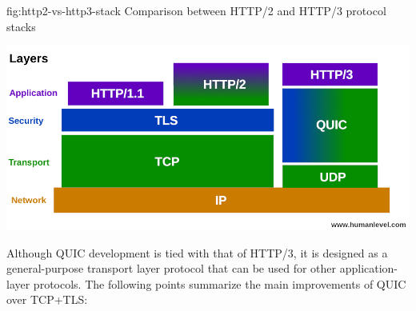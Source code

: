 \begin{myFigure}
  {fig:http2-vs-http3-stack}
  {Comparison between HTTP/2 and HTTP/3 protocol stacks}

  \includegraphics[width=\textwidth]{img/01-pile-http-protocol}


\end{myFigure}


Although QUIC development is tied with that of HTTP/3, it is designed as a general-purpose transport
layer protocol that can be used for other application-layer protocols. The following points
summarize the main improvements of QUIC over TCP+TLS:


